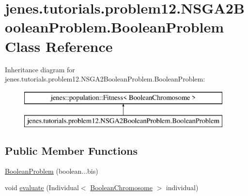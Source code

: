 \hypertarget{classjenes_1_1tutorials_1_1problem12_1_1_n_s_g_a2_boolean_problem_1_1_boolean_problem}{\section{jenes.\-tutorials.\-problem12.\-N\-S\-G\-A2\-Boolean\-Problem.\-Boolean\-Problem Class Reference}
\label{classjenes_1_1tutorials_1_1problem12_1_1_n_s_g_a2_boolean_problem_1_1_boolean_problem}
}
Inheritance diagram for jenes.\-tutorials.\-problem12.\-N\-S\-G\-A2\-Boolean\-Problem.\-Boolean\-Problem\-:\begin{figure}[H]
\begin{center}
\leavevmode
\includegraphics[height=2.000000cm]{classjenes_1_1tutorials_1_1problem12_1_1_n_s_g_a2_boolean_problem_1_1_boolean_problem}
\end{center}
\end{figure}
\subsection*{Public Member Functions}
\begin{DoxyCompactItemize}
\item 
\hyperlink{classjenes_1_1tutorials_1_1problem12_1_1_n_s_g_a2_boolean_problem_1_1_boolean_problem_a7c0d3388b0a7d40cc7cb5f8eb8c04bb7}{Boolean\-Problem} (boolean...\-bis)
\item 
void \hyperlink{classjenes_1_1tutorials_1_1problem12_1_1_n_s_g_a2_boolean_problem_1_1_boolean_problem_a7b37d9eab2075fecb2048bea918856a2}{evaluate} (Individual$<$ \hyperlink{classjenes_1_1chromosome_1_1_boolean_chromosome}{Boolean\-Chromosome} $>$ individual)
\end{DoxyCompactItemize}


